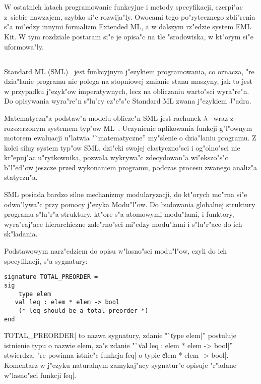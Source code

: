 
\section{\secover}
\label{sec:over}

W ostatnich latach programowanie funkcyjne i metody specyfikacji,
czerpi"ac z~siebie nawzajem, szybko si"e rozwija"ly.
Owocami tego po"rytecznego zbli\-"re\-nia s"a mi"edzy innymi formalizm Extended ML,
a w dalszym rz"edzie system EML Kit.
W tym rozdziale postaram si"e je opisa"c 
na tle "srodowiska, w kt"orym si"e uformowa"ly.

\subsection{\secsml}
\label{sec:sml}

Standard ML (SML)~\cite{MTH90} jest funkcyjnym j"ezykiem programowania,
co oznacza, "re dzia"lanie programu nie polega na stopniowej zmianie stanu maszyny,
jak to jest w przypadku j"ezyk"ow imperatywnych,
lecz na obliczaniu warto"sci wyra"re"n. 
Do opisywania wyra"re"n s"lu"ry cz"e"s"c Standard ML
zwana j"ezykiem J"adra.

Matematyczn"a podstaw"a modelu oblicze"n SML jest 
rachunek $\lambda$~\cite{Bar84} wraz z rozszerzonym systemem typ"ow ML~\cite{DM82}.
Uczynienie aplikowania funkcji g"l"ownym motorem ewaluacji
u"latwia "`matematyczne'' my"slenie o dzia"laniu programu.
Z kolei silny system typ"ow SML, dzi"eki swojej elastyczno"sci i og"olno"sci
nie kr"epuj"ac u"rytkownika, pozwala wykrywa"c
zdecydowan"a wi"ek\-szo"s"c b"l"ed"ow jeszcze przed wykonaniem programu,
podczas procesu zwanego analiz"a statyczn"a.

SML posiada bardzo silne mechanizmy modularyzacji,
do kt"orych mo"rna si"e odwo"lywa"c przy pomocy j"ezyka Modu"l"ow.
Do budowania globalnej struktury programu s"lu"r"a struktury,
kt"ore s"a atomowymi modu"lami, i funktory, wyra"raj"ace hierarchiczne 
zale"rno"sci mi"edzy modu"lami i s"lu"r"ace do ich sk"la\-da\-nia.

Podstawowym narz"edziem do opisu w"lasno"sci modu"l"ow, 
czyli do ich specyfikacji, s"a sygnatury:

\begin{verbatim}
signature TOTAL_PREORDER =
sig
    type elem 
   val leq : elem * elem -> bool 
    (* leq should be a total preorder *)
end
\end{verbatim}
\|TOTAL_PREORDER| to nazwa sygnatury, zdanie "`\|type elem|'' postuluje istnienie
typu o nazwie elem, za"s zdanie "`\|val leq : elem * elem -> bool|'' stwierdza, 
"re powinna istnie"c funkcja \|leq| o typie \|elem * elem -> bool|.
Komentarz w j"ezyku naturalnym zamykaj"acy sygnatur"e opisuje "r"adane w"las\-no\-"sci funkcji \|leq|.

